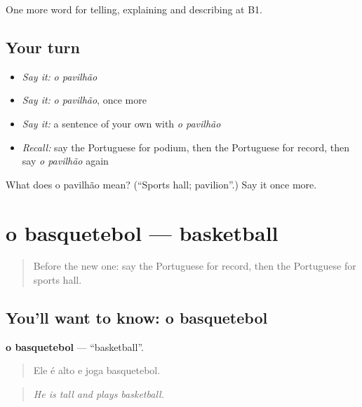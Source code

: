 \begin{grammarlens}[title={What you've built}]
One more word for telling, explaining and describing at B1.
\end{grammarlens}

\subsection*{Your turn}
\begin{itemize}
\raggedright
  \item \emph{Say it:} \emph{o pavilhão}
  \item \emph{Say it:} \emph{o pavilhão}, once more
  \item \emph{Say it:} a sentence of your own with \emph{o pavilhão}
  \item \emph{Recall:} say the Portuguese for podium, then the Portuguese for record, then say \emph{o pavilhão} again
\end{itemize}

\begin{tcolorbox}[breakable,colback=teal!4,colframe=teal!35!black,title={Before you move on}]
What does o pavilhão mean? (\textquotedblleft{}Sports hall; pavilion\textquotedblright{}.) Say it once more.
\end{tcolorbox}
\section[o basquetebol]{o basquetebol — basketball}

\label{lesson:PT-C512-basquetebol}



\begin{quote}
Before the new one: say the Portuguese for record, then the Portuguese for sports hall.
\end{quote}

\subsection*{You'll want to know: o basquetebol}
\textbf{o basquetebol} — \textquotedblleft{}basketball\textquotedblright{}.

\begin{quote}
Ele é alto e joga basquetebol.
\end{quote}

\begin{quote}
\emph{He is tall and plays basketball.}
\end{quote}

